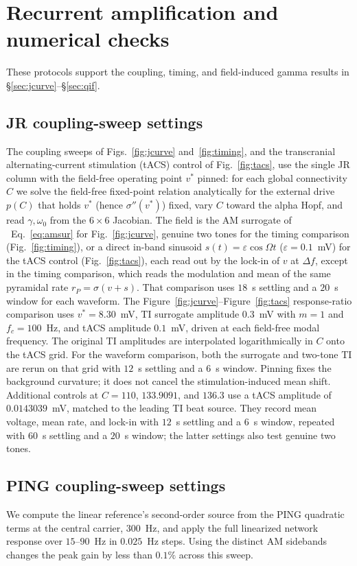 \documentclass[11pt,a4paper]{article}
\newif\ifjne
\newif\ifsupp
\newcommand{\Sig}{\sigma}
\providecommand{\DIFaddtex}[1]{{\protect\color{blue} \sf #1}} %
\providecommand{\DIFaddbegin}{} %
\providecommand{\DIFadd}[1]{\texorpdfstring{\DIFaddtex{#1}}{#1}} %
\begin{document}
\section{Recurrent amplification and numerical checks}\label{supp:amplification}
These protocols support the coupling, timing, and field-induced gamma results in
\S\ref{sec:jcurve}--\S\ref{sec:qif}.
\subsection{JR coupling-sweep settings}\label{app:jr-sweep-settings}
The coupling sweeps of Figs.~\ref{fig:jcurve} and~\ref{fig:timing}, and the transcranial
alternating-current stimulation (tACS) control of Fig.~\ref{fig:tacs}, use the single JR
column with the field-free operating point $v^*$ pinned: for
each global connectivity $C$ we solve the field-free fixed-point relation analytically
for the external drive $p(C)$ that holds $v^*$ (hence $\Sig''(v^*)$) fixed, vary $C$
toward the alpha Hopf, and read $\gamma,\omega_0$ from the $6\times6$ Jacobian. The field
is the AM surrogate of \ifsupp main-text\fi\ Eq.~\eqref{eq:amsur} for Fig.~\ref{fig:jcurve}, genuine two
tones for the timing comparison (Fig.~\ref{fig:timing}), or a direct in-band sinusoid $s(t)=\varepsilon\cos\Omega t$
($\varepsilon=0.1$~mV) for the tACS control (Fig.~\ref{fig:tacs}), each read out by the
lock-in of $v$ at $\Delta f$, except in the timing comparison, which reads the
modulation and mean of the same pyramidal rate $r_P=\Sig(v+s)$.
That comparison uses $18$~s settling and a $20$~s window for each waveform.
The Figure~\ref{fig:jcurve}--Figure~\ref{fig:tacs} response-ratio comparison uses
$v^*=8.30$~mV, TI surrogate amplitude $0.3$~mV with $m=1$ and $f_c=100$~Hz,
and tACS amplitude $0.1$~mV, driven at each field-free modal frequency.
The original TI amplitudes are interpolated logarithmically in $C$ onto the tACS
grid. For the waveform comparison, both the surrogate and two-tone TI are rerun
on that grid with $12$~s settling and a $6$~s window.
Pinning fixes the background curvature; it does not cancel the stimulation-induced
mean shift.
Additional controls at $C=110$, $133.9091$, and $136.3$ use a tACS amplitude of
$0.0143039$~mV, matched to the leading TI beat source. They record mean voltage,
mean rate, and lock-in with $12$~s settling and a $6$~s window, repeated with
$60$~s settling and a $20$~s window; the latter settings also test genuine two tones.


\DIFaddbegin \ifjne
\subsection{\DIFadd{PING coupling-sweep settings}}\label{supp:ping-runs}
\DIFadd{We compute the linear reference's
second-order source from the PING quadratic terms at the central carrier,
$300$~Hz, and apply the full linearized network response over $15$--$90$~Hz
in $0.025$~Hz steps. Using the distinct AM sidebands changes the peak gain by
less than $0.1\%$ across this sweep.
}
\end{document}
